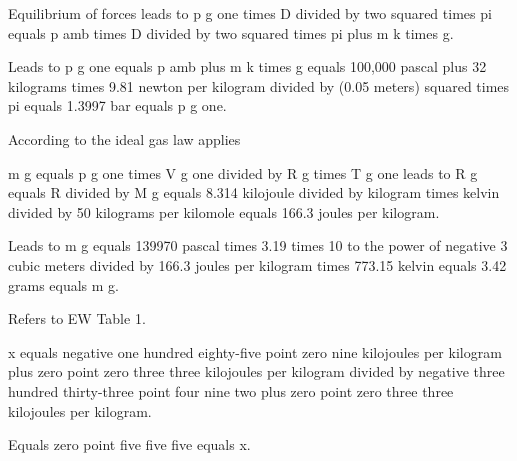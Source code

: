 Equilibrium of forces leads to p g one times D divided by two squared times pi equals p amb times D divided by two squared times pi plus m k times g.

Leads to p g one equals p amb plus m k times g equals 100,000 pascal plus 32 kilograms times 9.81 newton per kilogram divided by (0.05 meters) squared times pi equals 1.3997 bar equals p g one.

According to the ideal gas law applies

m g equals p g one times V g one divided by R g times T g one leads to R g equals R divided by M g equals 8.314 kilojoule divided by kilogram times kelvin divided by 50 kilograms per kilomole equals 166.3 joules per kilogram.

Leads to m g equals 139970 pascal times 3.19 times 10 to the power of negative 3 cubic meters divided by 166.3 joules per kilogram times 773.15 kelvin equals 3.42 grams equals m g.

Refers to EW Table 1.  

x equals negative one hundred eighty-five point zero nine kilojoules per kilogram plus zero point zero three three kilojoules per kilogram divided by negative three hundred thirty-three point four nine two plus zero point zero three three kilojoules per kilogram.  

Equals zero point five five five equals x.